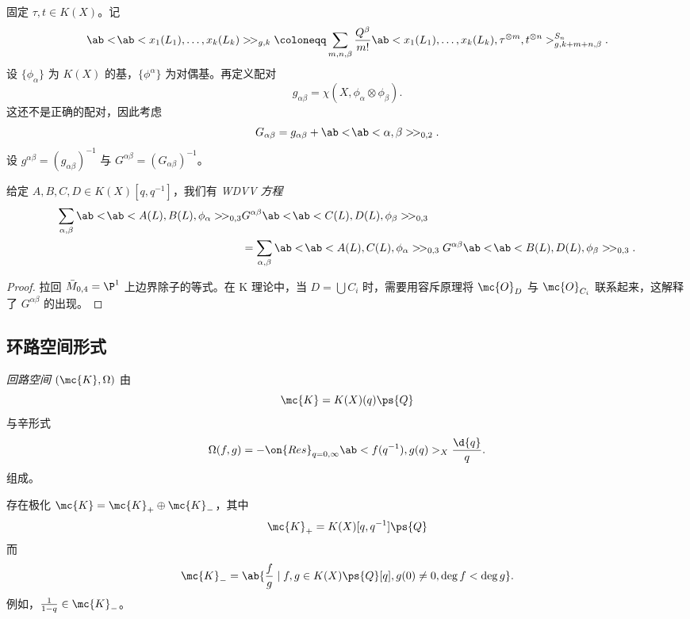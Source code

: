 \begin{notn}
    固定 \(\tau, t \in K(X)\)。记
    \[ \ab<\!\ab<x_1(L_1), \ldots, x_k(L_k)>\!>_{g,k} \coloneqq \sum_{m,n,\beta} \frac{Q^{\beta}}{m!} \ab<x_1(L_1), \ldots, x_k(L_k), \tau^{\otimes m}, t^{\otimes n}>_{g,k+m+n,\beta}^{S_n}. \]
    设 \(\{\phi_{\alpha}\}\) 为 \(K(X)\) 的基，\(\{\phi^{\alpha}\}\) 为对偶基。再定义配对
    \[ g_{\alpha\beta} = \chi(X, \phi_{\alpha} \otimes \phi_{\beta}). \]
    这还不是正确的配对，因此考虑
    \[ G_{\alpha\beta} = g_{\alpha\beta} + \ab<\!\ab<\alpha,\beta>\!>_{0,2}. \]
    设 \(g^{\alpha\beta} = (g_{\alpha\beta})^{-1}\) 与 \(G^{\alpha\beta} = (G_{\alpha\beta})^{-1}\)。
\end{notn}

\begin{lem}
    给定 \(A,B,C,D \in K(X)[q,q^{-1}]\)，我们有 \textit{WDVV 方程}
    \begin{align*}
        \sum_{\alpha,\beta} \ab<\!\ab< A(L), B(L), \phi_{\alpha}>\! >_{0,3}& G^{\alpha\beta}\ab<\!\ab< C(L), D(L), \phi_{\beta}>\! >_{0,3} \\
        &= \sum_{\alpha,\beta} \ab<\!\ab< A(L), C(L), \phi_{\alpha}>\! >_{0,3} G^{\alpha\beta}\ab<\!\ab< B(L), D(L), \phi_{\beta}>\! >_{0,3}.
    \end{align*}
\end{lem}

\begin{proof}
    拉回 \(\bar{M}_{0,4} = \P^1\) 上边界除子的等式。在 K 理论中，当 \(D = \bigcup C_i\) 时，需要用容斥原理将 \(\mc{O}_D\) 与 \(\mc{O}_{C_i}\) 联系起来，这解释了 \(G^{\alpha\beta}\) 的出现。
\end{proof}

\subsection{环路空间形式}%
\label{sub:Loop space formalism}

\begin{defn}
    \textit{回路空间} \((\mc{K}, \Omega)\) 由
    \[ \mc{K} = K(X)(q) \ps{Q}\]
    与辛形式
    \[ \Omega(f, g) = - \on{Res}_{q = 0, \infty} \ab<f(q^{-1}), g(q)>_X \frac{\d{q}}{q}. \]
    组成。
\end{defn}

\begin{rmk}
    存在极化 \(\mc{K} = \mc{K}_+ \oplus \mc{K}_-\)，其中
    \[ \mc{K}_+ = K(X)[q, q^{-1}]\ps{Q} \]
    而
    \[ \mc{K}_- = \ab\{ \frac{f}{g} \mid f, g \in K(X)\ps{Q}[q], g(0) \neq 0, \deg f < \deg g\}. \]
    例如，\(\frac{1}{1-q} \in \mc{K}_-\)。
\end{rmk}

